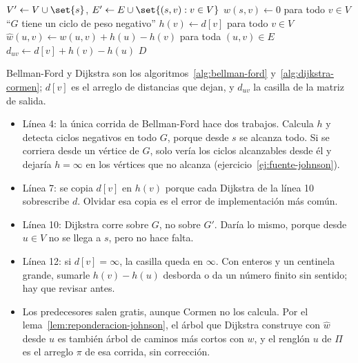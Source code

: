 \documentclass[11pt,letterpaper]{article}
\begin{document}
\begin{algorithm}[H]
\caption{\textsc{Johnson}$(G, w)$}
\label{alg:johnson}
\begin{algorithmic}[1]
  \State $V' \gets V \cup \set{s}$, \quad
         $E' \gets E \cup \set{(s, v) : v \in V}$
  \State $w(s, v) \gets 0$ para todo $v \in V$
    \State \Return ``$G$ tiene un ciclo de peso negativo''
  \EndIf
  \State $h(v) \gets d[v]$ para todo $v \in V$
  \State $\hat{w}(u, v) \gets w(u, v) + h(u) - h(v)$ para toda
         $(u, v) \in E$ 
    \State {}
      \State $d_{uv} \gets d[v] + h(v) - h(u)$
    \EndFor
  \EndFor
  \State \Return $D$
\EndProcedure
\end{algorithmic}
\end{algorithm}

Bellman-Ford y Dijkstra son los algoritmos~\ref{alg:bellman-ford}
y~\ref{alg:dijkstra-cormen}; $d[v]$ es el arreglo de distancias que
dejan, y $d_{uv}$ la casilla de la matriz de salida.
\begin{itemize}[itemsep=0.1em]
  \item Línea 4: la única corrida de Bellman-Ford hace dos trabajos.
        Calcula $h$ y detecta ciclos negativos en todo $G$, porque
        desde $s$ se alcanza todo. Si se corriera desde un vértice de
        $G$, solo vería los ciclos alcanzables desde él y dejaría
        $h = \infty$ en los vértices que no alcanza
        (ejercicio~\ref{ej:fuente-johnson}).
  \item Línea 7: se copia $d[v]$ en $h(v)$ porque cada Dijkstra de la
        línea 10 sobrescribe $d$. Olvidar esa copia es el error de
        implementación más común.
  \item Línea 10: Dijkstra corre sobre $G$, no sobre $G'$. Daría lo
        mismo, porque desde $u \in V$ no se llega a $s$, pero no hace
        falta.
  \item Línea 12: si $d[v] = \infty$, la casilla queda en $\infty$. Con
        enteros y un centinela grande, sumarle $h(v) - h(u)$ desborda o
        da un número finito sin sentido; hay que revisar antes.
  \item Los predecesores salen gratis, aunque Cormen no los calcula.
        Por el lema~\ref{lem:reponderacion-johnson}, el árbol que
        Dijkstra construye con $\hat{w}$ desde $u$ es también árbol de
        caminos más cortos con $w$, y el renglón $u$ de $\Pi$ es el
        arreglo $\pi$ de esa corrida, sin corrección.
\end{itemize}
\end{document}
